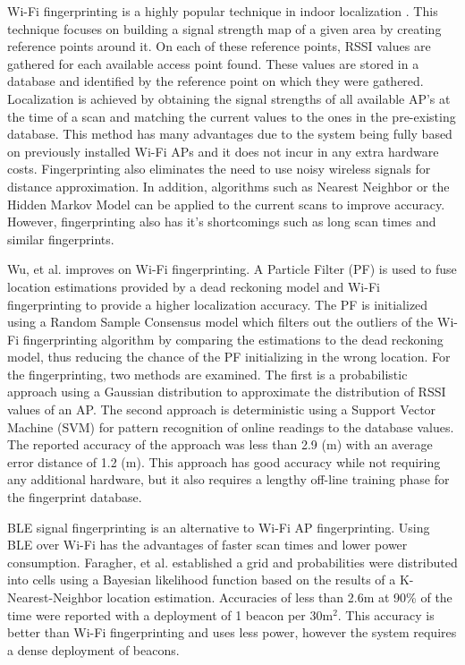 \documentclass[conference]{IEEEtran}
\begin{document}
Wi-Fi fingerprinting is a highly popular technique in indoor localization \cite{chan2012indoor,navarro2010wi}. This technique focuses on  building a signal strength map of a given area by creating reference points around it. On each of these reference points, RSSI values are gathered for each available access point found. These values are stored in a database and identified by the reference point on which they were gathered. Localization is achieved by obtaining the signal strengths of all available AP’s at the time of a scan and matching the current values to the ones in the pre-existing database. This method has many advantages due to the system being fully based on previously installed Wi-Fi APs and it does not incur in any extra hardware costs. Fingerprinting also eliminates the need to use noisy wireless signals for distance approximation. In addition, algorithms such as Nearest Neighbor or the Hidden Markov Model can be applied to the current scans to improve accuracy. However, fingerprinting also has it’s shortcomings such as long scan times and similar fingerprints.

Wu, et al. \cite{wu2016improved} improves on  Wi-Fi fingerprinting. A Particle Filter (PF) is used to fuse location estimations provided by a dead reckoning model and Wi-Fi fingerprinting to provide a higher localization accuracy. The PF is initialized using a Random Sample Consensus model which filters out the outliers of the Wi-Fi fingerprinting algorithm by comparing the estimations to the dead reckoning model, thus reducing the chance of the PF initializing in the wrong location. For the fingerprinting, two methods are examined. The first is a probabilistic approach using a Gaussian distribution to approximate the distribution of RSSI values of an AP. The second approach is deterministic using a Support Vector Machine (SVM) for pattern recognition of online readings to the database values.  The reported accuracy of the approach was less than 2.9 (m) with an average error distance of 1.2 (m). This approach has good accuracy while not requiring any additional hardware, but it also requires a lengthy off-line training phase for the fingerprint database.

BLE signal fingerprinting is an alternative to Wi-Fi AP fingerprinting. Using BLE over Wi-Fi has the advantages of faster scan times and lower power consumption. Faragher, et al. \cite{faragher2015location} established a grid and probabilities were distributed into cells using a Bayesian likelihood function based on the results of a K-Nearest-Neighbor location estimation. Accuracies of less than 2.6m at 90\% of the time were reported with a deployment of 1 beacon per 30m$^2$. This accuracy is better than Wi-Fi fingerprinting and uses less power, however the  system  requires a dense deployment of beacons.
\end{document}
